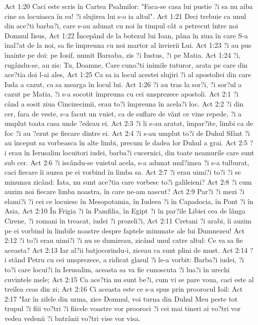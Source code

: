 Act 1:20  Caci este scris în Cartea Psalmilor: "Faca-se casa lui pustie ?i sa nu aiba cine sa locuiasca în ea! ?i slujirea lui s-o ia altul".
Act 1:21  Deci trebuie ca unul din ace?ti barba?i, care s-au adunat cu noi în timpul cât a petrecut între noi Domnul Iisus,
Act 1:22  Începând de la botezul lui Ioan, pâna în ziua în care S-a înal?at de la noi, sa fie împreuna cu noi martor al învierii Lui.
Act 1:23  ?i au pus înainte pe doi: pe Iosif, numit Barsaba, zis ?i Iustus, ?i pe Matia.
Act 1:24  ?i, rugându-se, au zis: Tu, Doamne, Care cuno?ti inimile tuturor, arata pe care din ace?tia doi l-ai ales,
Act 1:25  Ca sa ia locul acestei slujiri ?i al apostoliei din care Iuda a cazut, ca sa mearga în locul lui.
Act 1:26  ?i au tras la sor?i, ?i sor?ul a cazut pe Matia, ?i s-a socotit împreuna cu cei unsprezece apostoli.
Act 2:1  ?i când a sosit ziua Cincizecimii, erau to?i împreuna în acela?i loc.
Act 2:2  ?i din cer, fara de veste, s-a facut un vuiet, ca de suflare de vânt ce vine repede, ?i a umplut toata casa unde ?edeau ei.
Act 2:3  ?i li s-au aratat, împar?ite, limbi ca de foc ?i au ?ezut pe fiecare dintre ei.
Act 2:4  ?i s-au umplut to?i de Duhul Sfânt ?i au început sa vorbeasca în alte limbi, precum le dadea lor Duhul a grai.
Act 2:5  ?i erau în Ierusalim locuitori iudei, barba?i cucernici, din toate neamurile care sunt sub cer.
Act 2:6  ?i iscându-se vuietul acela, s-a adunat mul?imea ?i s-a tulburat, caci fiecare îi auzea pe ei vorbind în limba sa.
Act 2:7  ?i erau uimi?i to?i ?i se minunau zicând: Iata, nu sunt ace?tia care vorbesc to?i galileieni?
Act 2:8  ?i cum auzim noi fiecare limba noastra, în care ne-am nascut?
Act 2:9  Par?i ?i mezi ?i elami?i ?i cei ce locuiesc în Mesopotamia, în Iudeea ?i în Capadocia, în Pont ?i în Asia,
Act 2:10  În Frigia ?i în Pamfilia, în Egipt ?i în par?ile Libiei cea de lânga Cirene, ?i romani în treacat, iudei ?i prozeli?i,
Act 2:11  Cretani ?i arabi, îi auzim pe ei vorbind în limbile noastre despre faptele minunate ale lui Dumnezeu!
Act 2:12  ?i to?i erau uimi?i ?i nu se dumireau, zicând unul catre altul: Ce va sa fie aceasta?
Act 2:13  Iar al?ii batjocorindu-i, ziceau ca sunt plini de must.
Act 2:14  ?i stând Petru cu cei unsprezece, a ridicat glasul ?i le-a vorbit: Barba?i iudei, ?i to?i care locui?i în Ierusalim, aceasta sa va fie cunoscuta ?i lua?i în urechi cuvintele mele;
Act 2:15  Ca ace?tia nu sunt be?i, cum vi se pare voua, caci este al treilea ceas din zi;
Act 2:16  Ci aceasta este ce s-a spus prin proorocul Ioil:
Act 2:17  "Iar în zilele din urma, zice Domnul, voi turna din Duhul Meu peste tot trupul ?i fiii vo?tri ?i fiicele voastre vor prooroci ?i cei mai tineri ai vo?tri vor vedea vedenii ?i batrânii vo?tri vise vor visa.
